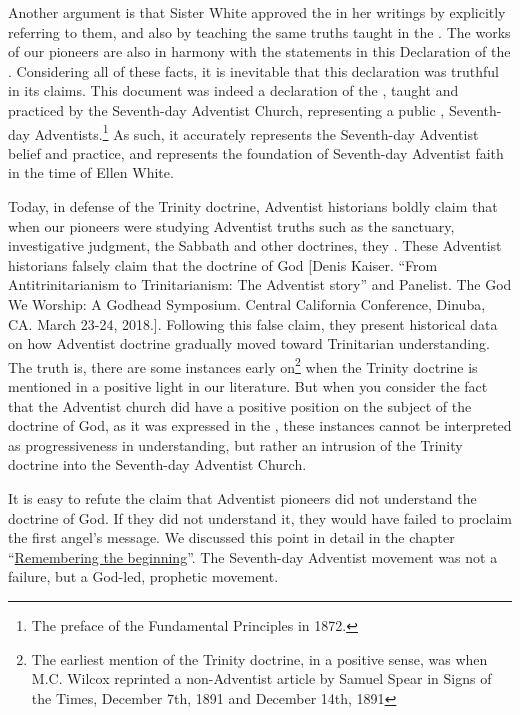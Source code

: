 Another argument is that Sister White approved the  in her writings by explicitly referring to them, and also by teaching the same truths taught in the . The works of our pioneers are also in harmony with the statements in this Declaration of the . Considering all of these facts, it is inevitable that this declaration was truthful in its claims. This document was indeed a declaration of the , taught and practiced by the Seventh-day Adventist Church, representing a public ,  Seventh-day Adventists.\footnote{The preface of the Fundamental Principles in 1872.} As such, it accurately represents the Seventh-day Adventist belief and practice, and represents the foundation of Seventh-day Adventist faith in the time of Ellen White.

Today, in defense of the Trinity doctrine, Adventist historians boldly claim that when our pioneers were studying Adventist truths such as the sanctuary, investigative judgment, the Sabbath and other doctrines, they . These Adventist historians falsely claim that the doctrine of God [Denis Kaiser. “From Antitrinitarianism to Trinitarianism: The Adventist story” and Panelist. The God We Worship: A Godhead Symposium. Central California Conference, Dinuba, CA. March 23-24, 2018.]. Following this false claim, they present historical data on how Adventist doctrine gradually moved toward Trinitarian understanding. The truth is, there are some instances early on\footnote{The earliest mention of the Trinity doctrine, in a positive sense, was when M.C. Wilcox reprinted a non-Adventist article by Samuel Spear in Signs of the Times, December 7th, 1891 and December 14th, 1891} when the Trinity doctrine is mentioned in a positive light in our literature. But when you consider the fact that the Adventist church did have a positive position on the subject of the doctrine of God, as it was expressed in the , these instances cannot be interpreted as progressiveness in understanding, but rather an intrusion of the Trinity doctrine into the Seventh-day Adventist Church.

It is easy to refute the claim that Adventist pioneers did not understand the doctrine of God. If they did not understand it, they would have failed to proclaim the first angel’s message. We discussed this point in detail in the chapter “\hyperref[chap:remembering-the-beginning]{Remembering the beginning}”. The Seventh-day Adventist movement was not a failure, but a God-led, prophetic movement.

